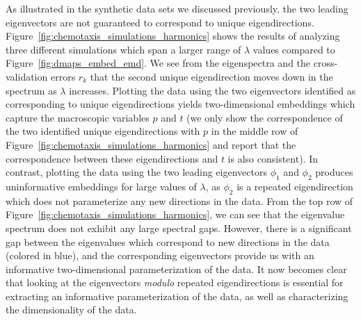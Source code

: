 \documentclass[preprint]{elsarticle}
\begin{document}
As illustrated in the synthetic data sets we discussed previously, the two leading eigenvectors are not guaranteed to correspond to unique eigendirections. 
%
Figure~\ref{fig:chemotaxis_simulations_harmonics} shows the results of analyzing three different simulations which span a larger range of $\lambda$ values compared to Figure~\ref{fig:dmaps_embed_emd}. 
%
We see from the eigenspectra and the cross-validation errors $r_k$ that the second unique eigendirection moves down in the spectrum as $\lambda$ increases. 
%
Plotting the data using the two eigenvectors identified as corresponding to unique eigendirections yields two-dimensional embeddings which capture the macroscopic variables $p$ and $t$ (we only show the correspondence of the two identified unique eigendirections with $p$ in the middle row of Figure~\ref{fig:chemotaxis_simulations_harmonics} and report that the correspondence between these eigendirections and $t$ is also consistent). 
%
In contrast, plotting the data using the two leading eigenvectors $\phi_1$ and $\phi_2$ produces uninformative embeddings for large values of $\lambda$, as $\phi_2$ is a repeated eigendirection which does not parameterize any new directions in the data.
%
From the top row of Figure~\ref{fig:chemotaxis_simulations_harmonics}, we can see that the eigenvalue spectrum does not exhibit any large spectral gaps.
%
However, there is a significant gap between the eigenvalues which correspond to new directions in the data (colored in blue), and the corresponding eigenvectors provide us with an informative two-dimensional parameterization of the data. %
%
It now becomes clear that looking at the eigenvectors {\em modulo} repeated eigendirections is essential for extracting an informative parameterization of the data, as well as characterizing the dimensionality of the data. 
\end{document}
